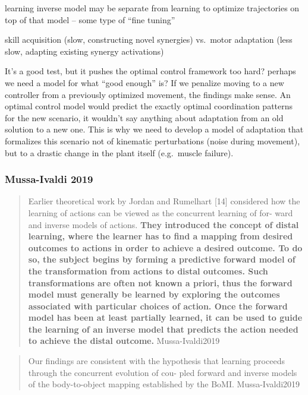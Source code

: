 \documentclass[
  a4paper,
]{article}
\begin{document}
learning inverse model may be separate from learning to optimize
trajectories on top of that model -- some type of ``fine tuning''

skill acquisition (slow, constructing novel synergies) vs.~motor
adaptation (less slow, adapting existing synergy activations)

It's a good test, but it pushes the optimal control framework too hard?
perhaps we need a model for what ``good enough'' is? If we penalize
moving to a new controller from a previously optimized movement, the
findings make sense. An optimal control model would predict the exactly
optimal coordination patterns for the new scenario, it wouldn't say
anything about adaptation from an old solution to a new one. This is why
we need to develop a model of adaptation that formalizes this scenario
not of kinematic perturbations (noise during movement), but to a drastic
change in the plant itself (e.g.~muscle failure).

\hypertarget{mussa-ivaldi-2019}{%
\subsubsection{Mussa-Ivaldi 2019}\label{mussa-ivaldi-2019}}

\begin{quote}
Earlier theoretical work by Jordan and Rumelhart {[}14{]} considered how
the learning of actions can be viewed as the concurrent learning of for-
ward and inverse models of actions. \textbf{They introduced the concept
of distal learning, where the learner has to find a mapping from desired
outcomes to actions in order to achieve a desired outcome. To do so, the
subject begins by forming a predictive forward model of the
transformation from actions to distal outcomes. Such transformations are
often not known a priori, thus the forward model must generally be
learned by exploring the outcomes associated with particular choices of
action. Once the forward model has been at least partially learned, it
can be used to guide the learning of an inverse model that predicts the
action needed to achieve the distal outcome.} Mussa-Ivaldi2019
\end{quote}

\begin{quote}
Our findings are consistent with the hypothesis that learning proceeds
through the concurrent evolution of cou- pled forward and inverse models
of the body-to-object mapping established by the BoMI. Mussa-Ivaldi2019
\end{quote}
\end{document}
